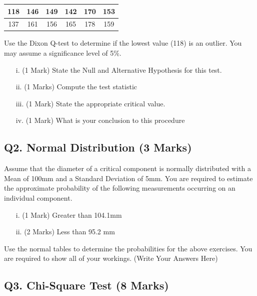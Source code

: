 \documentclass[a4paper,12pt]{article}
\begin{document}
\begin{center}
	\begin{tabular}{|c|c|c|c|c|c|}
		\hline
		118 & 146 & 149 & 142 & 170& 153\\ \hline
		137 & 161 & 156& 165&  178& 159
		\\ \hline
	\end{tabular}
\end{center}
Use the Dixon Q-test to determine if the lowest value (118) is an outlier. You may assume a significance level of 5\%.
\begin{itemize}
	\item[i.](1 Mark)	State the Null and Alternative Hypothesis for this test.
	\item[ii.](1 Marks) Compute the test statistic
	\item[iii.](1 Mark) State the appropriate critical value.
	\item[iv.](1 Mark) What is your conclusion to this procedure
\end{itemize}


\newpage
\subsection*{Q2. Normal Distribution (3 Marks)} %
Assume that the diameter of a critical component is normally distributed with a Mean of 100mm and a Standard Deviation of 5mm. You are required  to estimate the approximate probability of the following measurements occurring on an individual component.
\begin{itemize}
	\item[i.](1 Mark)	Greater than 104.1mm
	\item[ii.](2 Marks) Less than 95.2 mm
\end{itemize}
\bigskip
\noindent Use the normal tables to determine the probabilities for the above exercises. You are required to show all of your workings.
\newpage
(Write Your Answers Here)
\newpage

\subsection*{Q3. Chi-Square Test (8 Marks)} %
\end{document}
